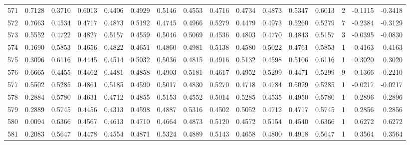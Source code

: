 \begin{tabular}{lrrrrrrrrrrrrrrr}
571 &      0.7128 &  0.3710 &  0.6013 &  0.4406 &  0.4929 &  0.5146 &  0.4553 &  0.4716 &  0.4734 &  0.4873 &   0.5347 &     0.6013 &      2 &                   -0.1115 &                    -0.3418 \\
572 &      0.7663 &  0.4534 &  0.4717 &  0.4873 &  0.5192 &  0.4745 &  0.4966 &  0.5279 &  0.4479 &  0.4973 &   0.5260 &     0.5279 &      7 &                   -0.2384 &                    -0.3129 \\
573 &      0.5552 &  0.4722 &  0.4827 &  0.5157 &  0.4559 &  0.5046 &  0.5069 &  0.4536 &  0.4803 &  0.4770 &   0.4843 &     0.5157 &      3 &                   -0.0395 &                    -0.0830 \\
574 &      0.1690 &  0.5853 &  0.4656 &  0.4822 &  0.4651 &  0.4860 &  0.4981 &  0.5138 &  0.4580 &  0.5022 &   0.4761 &     0.5853 &      1 &                    0.4163 &                     0.4163 \\
575 &      0.3096 &  0.6116 &  0.4445 &  0.4514 &  0.5032 &  0.5036 &  0.4815 &  0.4916 &  0.5132 &  0.4598 &   0.5106 &     0.6116 &      1 &                    0.3020 &                     0.3020 \\
576 &      0.6665 &  0.4455 &  0.4462 &  0.4481 &  0.4858 &  0.4903 &  0.5181 &  0.4617 &  0.4952 &  0.5299 &   0.4471 &     0.5299 &      9 &                   -0.1366 &                    -0.2210 \\
577 &      0.5502 &  0.5285 &  0.4861 &  0.5185 &  0.4590 &  0.5017 &  0.4830 &  0.5270 &  0.4718 &  0.4784 &   0.5029 &     0.5285 &      1 &                   -0.0217 &                    -0.0217 \\
578 &      0.2884 &  0.5780 &  0.4631 &  0.4712 &  0.4855 &  0.5153 &  0.4552 &  0.5014 &  0.5285 &  0.4535 &   0.4950 &     0.5780 &      1 &                    0.2896 &                     0.2896 \\
579 &      0.2889 &  0.5745 &  0.4456 &  0.4313 &  0.4598 &  0.4887 &  0.5316 &  0.4502 &  0.5052 &  0.4712 &   0.4717 &     0.5745 &      1 &                    0.2856 &                     0.2856 \\
580 &      0.0094 &  0.6366 &  0.4567 &  0.4613 &  0.4710 &  0.4664 &  0.4873 &  0.5120 &  0.4572 &  0.5154 &   0.4540 &     0.6366 &      1 &                    0.6272 &                     0.6272 \\
581 &      0.2083 &  0.5647 &  0.4478 &  0.4554 &  0.4871 &  0.5324 &  0.4889 &  0.5143 &  0.4658 &  0.4800 &   0.4918 &     0.5647 &      1 &                    0.3564 &                     0.3564 \\

\end{tabular}
